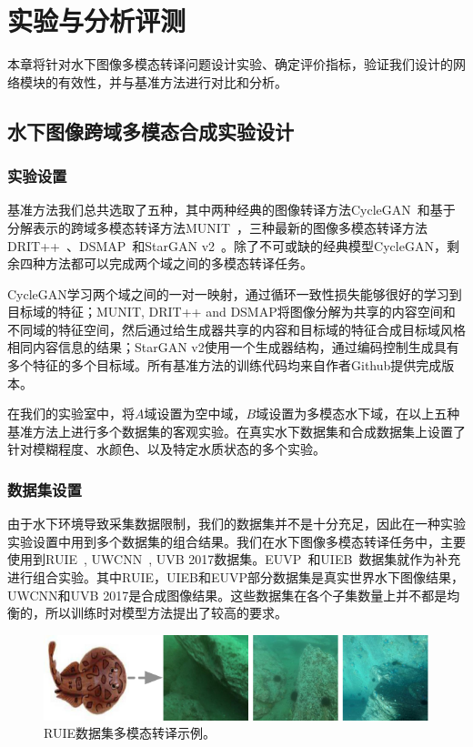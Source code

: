 \chapter{实验与分析评测}
本章将针对水下图像多模态转译问题设计实验、确定评价指标，验证我们设计的网络模块的有效性，并与基准方法进行对比和分析。

\section{水下图像跨域多模态合成实验设计}
\subsection{实验设置}
基准方法我们总共选取了五种，其中两种经典的图像转译方法CycleGAN~\citep{zhu2017unpaired}和基于分解表示的跨域多模态转译方法MUNIT~\citep{huang2018multimodal}，三种最新的图像多模态转译方法DRIT++~\citep{lee2020drit++}、DSMAP~\citep{chang2020domain}和StarGAN v2~\cite{choi2020stargan}。除了不可或缺的经典模型CycleGAN，剩余四种方法都可以完成两个域之间的多模态转译任务。

CycleGAN学习两个域之间的一对一映射，通过循环一致性损失能够很好的学习到目标域的特征；MUNIT, DRIT++ and DSMAP将图像分解为共享的内容空间和不同域的特征空间，然后通过给生成器共享的内容和目标域的特征合成目标域风格相同内容信息的结果；StarGAN v2使用一个生成器结构，通过编码控制生成具有多个特征的多个目标域。所有基准方法的训练代码均来自作者Github提供完成版本。

在我们的实验室中，将$A$域设置为空中域，$B$域设置为多模态水下域，在以上五种基准方法上进行多个数据集的客观实验。在真实水下数据集和合成数据集上设置了针对模糊程度、水颜色、以及特定水质状态的多个实验。

\subsection{数据集设置}
由于水下环境导致采集数据限制，我们的数据集并不是十分充足，因此在一种实验实验设置中用到多个数据集的组合结果。我们在水下图像多模态转译任务中，主要使用到RUIE~\citep{liu2019real}, UWCNN~\citep{li2020underwater}, UVB 2017数据集。EUVP~\citep{islam2019fast}和UIEB~\citep{li2019underwater}数据集就作为补充进行组合实验。其中RUIE，UIEB和EUVP部分数据集是真实世界水下图像结果，UWCNN和UVB 2017是合成图像结果。这些数据集在各个子集数量上并不都是均衡的，所以训练时对模型方法提出了较高的要求。

\begin{figure}[htp]
    \centering
	\includegraphics[width=\textwidth]{figures/ruie-dataset.pdf}
	\caption{RUIE数据集多模态转译示例。}
	\label{fig:ruie_dataset}
\end{figure}

